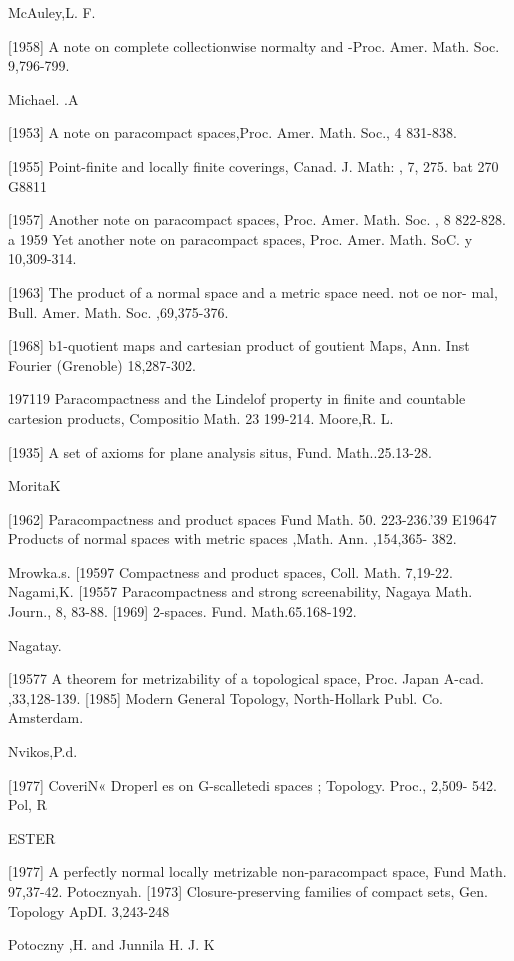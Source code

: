 \documentclass[main.tex]{subfiles}
\begin{document}
\noindent McAuley,L. F.

[1958]
A note on complete collectionwise normalty and
-Proc. Amer. Math. Soc. 9,796-799.

\noindent Michael. .A

[1953]
	A note on paracompact spaces,Proc. Amer. Math. Soc., 4 831-838.
	
[1955]
	Point-finite and locally finite coverings, Canad. J. Math: , 7, 275.
	bat 270
	G8811

[1957]
	Another note on paracompact spaces, Proc. Amer. Math. Soc. , 8
	822-828.
	a 1959 Yet another note on paracompact spaces, Proc. Amer. Math.
	SoC. y
	10,309-314.

[1963]
	The product of a normal space and a metric space
	need. not oe nor-
	mal, Bull. Amer. Math. Soc. ,69,375-376.

[1968]
	b1-quotient maps and cartesian product of goutient Maps, Ann. Inst
	Fourier (Grenoble) 18,287-302.

	197119 Paracompactness and the Lindelof property in finite and countable
	cartesion products, Compositio Math. 23 199-214.
	Moore,R. L.
	
[1935]
	A set of axioms for plane analysis situs, Fund. Math..25.13-28.
	
\noindent MoritaK

	[1962]
	Paracompactness and product spaces Fund Math. 50. 223-236.'39
	E19647 Products of normal spaces with metric spaces ,Math. Ann. ,154,365-
	382.

\noindent Mrowka.s.
	[19597 Compactness and product spaces, Coll. Math. 7,19-22.
	Nagami,K.
	[19557 Paracompactness and strong screenability, Nagaya Math. Journ., 8,
	83-88.
	[1969]
	2-spaces. Fund. Math.65.168-192.

\noindent Nagatay.

	[19577 A theorem for metrizability of a topological space, Proc. Japan A-cad. ,33,128-139.
	[1985]
	Modern General Topology, North-Hollark Publ. Co.
	~ Amsterdam.

\noindent Nvikos,P.d.

	[1977]
	CoveriN« Droperl
	es on G-scalletedi spaces ; Topology. Proc., 2,509-
	542.
	Pol, R

\noindent ESTER

	[1977] A perfectly normal locally metrizable non-paracompact space, Fund
	Math.
	97,37-42.
	Potocznyah.
	[1973]
	Closure-preserving families of compact sets, Gen. Topology ApDI.
	3,243-248

\noindent Potoczny ,H. and Junnila H. J. K
\end{document}
